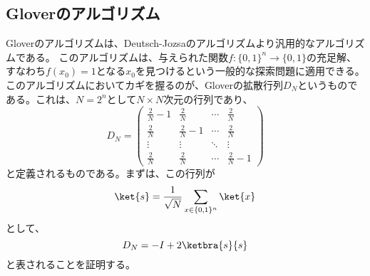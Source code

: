 \documentclass[a4paper,11pt,uplatex]{jsarticle}%
\begin{document}
\subsection{Gloverのアルゴリズム}
Gloverのアルゴリズムは、Deutsch-Jozsaのアルゴリズムより汎用的なアルゴリズムである。
このアルゴリズムは、与えられた関数$f\colon\{0,1\}^n\to\{0,1\}$の充足解、すなわち$f(x_0)=1$となる$x_0$を見つけるという一般的な探索問題に適用できる。
このアルゴリズムにおいてカギを握るのが、Gloverの拡散行列$D_{N}$というものである。これは、$N=2^n$として$N\times N$次元の行列であり、
\begin{equation}
  D_N = 
  \begin{pmatrix}
    \frac{2}{N}-1 & \frac{2}{N} & \cdots & \frac{2}{N} \\
    \frac{2}{N} & \frac{2}{N}-1 & \cdots & \frac{2}{N} \\
    \vdots & \vdots & \ddots & \vdots \\
    \frac{2}{N} & \frac{2}{N} & \cdots & \frac{2}{N}-1
  \end{pmatrix}
\end{equation}
と定義されるものである。まずは、この行列が
\begin{equation}
  \ket{s} = \frac{1}{\sqrt{N}}\sum_{x\in\{0,1\}^n}\ket{x}
\end{equation}
として、
\begin{equation}
  D_N = -I + 2\ketbra{s}{s}
\end{equation}
と表されることを証明する。
\end{document}
